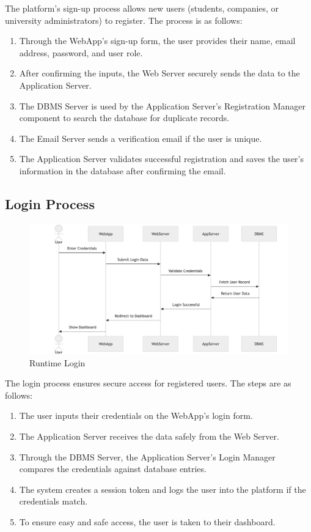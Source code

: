 The platform's sign-up process allows new users (students, companies, or university administrators) to register. The process is as follows:
\begin{enumerate}
    \item Through the WebApp's sign-up form, the user provides their name, email address, password, and user role.
    \item After confirming the inputs, the Web Server securely sends the data to the Application Server.
    \item The DBMS Server is used by the Application Server's Registration Manager component to search the database for duplicate records.
    \item The Email Server sends a verification email if the user is unique.
    \item The Application Server validates successful registration and saves the user's information in the database after confirming the email.
\end{enumerate}

\subsection{Login Process}
\label{subsec:login_process}

\begin{figure}[H]
    \begin{center}
        \includegraphics[width=0.82\linewidth]{JhaBhatiaSharma/imagesDD/LoginRuntime.png}
        \caption{Runtime Login}
        \label{fig:loginruntime}%
    \end{center}
\end{figure}

The login process ensures secure access for registered users. The steps are as follows:
\begin{enumerate}
    \item The user inputs their credentials on the WebApp’s login form.
    \item The Application Server receives the data safely from the Web Server.
    \item Through the DBMS Server, the Application Server's Login Manager compares the credentials against database entries.
    \item The system creates a session token and logs the user into the platform if the credentials match.
    \item To ensure easy and safe access, the user is taken to their dashboard.
\end{enumerate}


